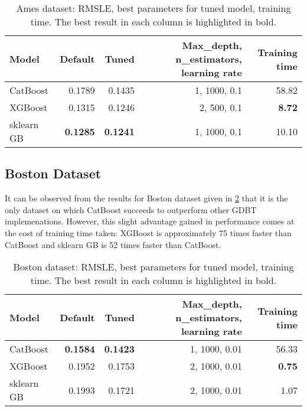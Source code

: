 \begin{table}[htbp]
	\centering
	\begin{tabular}{lrrrr}
		\toprule
		\textbf{Model} & \textbf{Default} & \textbf{Tuned} & \textbf{Max\_depth, n\_estimators, learning rate} & \textbf{Training time}  \\
		\midrule
		CatBoost & 0.1789 &  0.1435 & 1, 1000, 0.1  & 58.82\\
		XGBoost & 0.1315 & 0.1246 & 2, 500, 0.1 & \textbf{8.72} \\
		sklearn GB & \textbf{0.1285} & \textbf{0.1241} & 1, 1000, 0.1 & 10.10 \\
		\bottomrule
	\end{tabular}
	\caption{Ames dataset: RMSLE, best parameters for tuned model, training time. The best result in each column is highlighted in bold.}
	\label{tab:ames-results}
\end{table}

\subsection{Boston Dataset}
It can be observed from the results for Boston dataset given in \cref{tab:boston-results} that it is the only dataset on which CatBoost succeeds to outperform other GDBT implemenations. However, this slight advantage gained in performance comes at the cost of training time taken: XGBoost is approximately 75 times faster than CatBoost and sklearn GB is 52 times faster than CatBoost. 

\begin{table}[htbp]
	\centering
	\begin{tabular}{lrrrr}
		\toprule
		\textbf{Model} & \textbf{Default} & \textbf{Tuned} & \textbf{Max\_depth, n\_estimators, learning rate} & \textbf{Training time}  \\
		\midrule
		CatBoost & \textbf{0.1584} &  \textbf{0.1423} & 1, 1000, 0.01  & 56.33 \\
		XGBoost & 0.1952 & 0.1753  & 2, 1000, 0.01  & \textbf{0.75} \\
		sklearn GB & 0.1993 & 0.1721 & 2, 1000, 0.01  & 1.07 \\
		\bottomrule
	\end{tabular}
    \caption{Boston dataset: RMSLE, best parameters for tuned model, training time. The best result in each column is highlighted in bold.}
	\label{tab:boston-results}
\end{table}



